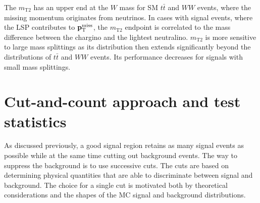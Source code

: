 The $m_{\text{T2}}$ has an upper end at the $W$ mass for SM $t\bar{t}$ and $WW$ events, where the missing momentum originates from neutrinos. In cases with signal events, where the LSP contributes to $ \mathbf{p}_{\text T}^{\text{miss}}$, the $m_{\text{T2}}$ endpoint is correlated to the mass difference between the chargino and the lightest neutralino. $m_{\text{T2}}$ is more sensitive to large mass splittings as its distribution then extends significantly beyond the distributions of $t\bar{t}$ and $WW$ events. Its performance decreases for signals with small mass splittings.  

\section{Cut-and-count approach and test statistics}
\label{subsec:stat}
As discussed previously, a good signal region retains as many signal events as possible while at the same time cutting out background events. The way to suppress the background is to use successive cuts. The cuts are based on determining physical quantities that are able to discriminate between signal and background. The choice for a single cut is motivated both by theoretical considerations and the shapes of the MC signal and background distributions. 

